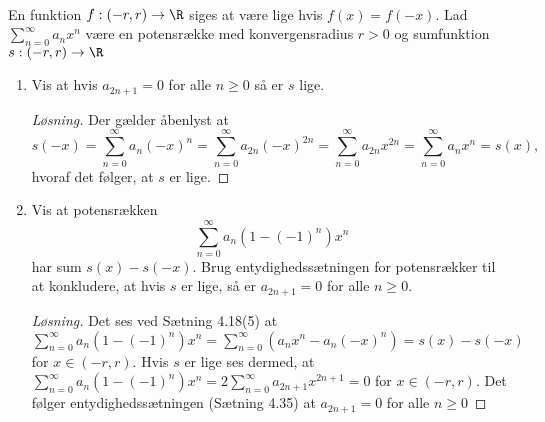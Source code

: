 	
		\begin{opg}\hfill \\
		En funktion $ f:(-r,r)\to \R $ siges at være lige hvis $ f(x)=f(-x) $. Lad $ \sum_{n=0}^{\infty}a_nx^n $ være en potensrække med konvergensradius $ r>0 $ og sumfunktion $ s:(-r,r)\to \R $
		\begin{enumerate}
			\item Vis at hvis $ a_{2n+1}=0 $ for alle $ n\geq 0 $ så er $ s $ lige.
			\ifanswers
			\begin{proof}[Løsning]
				Der gælder åbenlyst at $$ s(-x)=\sum_{n=0}^{\infty}a_n(-x)^n=\sum_{n=0}^{\infty}a_{2n}(-x)^{2n}=\sum_{n=0}^{\infty}a_{2n}x^{2n}=\sum_{n=0}^{\infty}a_nx^n=s(x), $$
				hvoraf det følger, at $ s $ er lige.
			\end{proof}
			\fi
			\item Vis at potensrækken $$ \sum_{n=0}^{\infty}a_n(1-(-1)^n)x^n $$ har sum $ s(x)-s(-x) $. Brug entydighedssætningen for potensr\ae{}kker til at konkludere, at hvis $ s $ er lige, så er $ a_{2n+1}=0 $ for alle $ n\geq 0 $.
			\ifanswers
			\begin{proof}[Løsning]
				Det ses ved Sætning 4.18(5) at $  \sum_{n=0}^{\infty}a_n(1-(-1)^n)x^n= \sum_{n=0}^{\infty}(a_nx^n-a_n(-x)^n)=s(x)-s(-x) $ for $ x\in(-r,r) $. Hvis $ s $ er lige ses dermed, at $ \sum_{n=0}^{\infty}a_n(1-(-1)^n)x^n=2\sum_{n=0}^{\infty}a_{2n+1}x^{2n+1}=0 $ for $ x\in(-r,r) $. Det følger entydighedssætningen (Sætning 4.35) at $ a_{2n+1}=0 $ for alle $ n\geq 0 $
			\end{proof}
			\fi
		\end{enumerate}
		
	\end{opg}